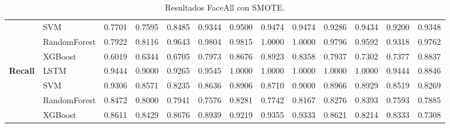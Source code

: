 \begin{table}[h]
\begin{adjustbox}{max width=15cm}
\begin{tabular}{|c|l|r|r|r|r|r|r|r|r|r|r|r|}
			& SVM &  0.7701 &  0.7595 &  0.8485 &  0.9344 &  0.9500 &  0.9474 &  0.9474 &  0.9286 &  0.9434 &  0.9200 &  0.9348 \\
			& RandomForest &  0.7922 &  0.8116 &  0.9643 &  0.9804 &  0.9815 &  1.0000 &  1.0000 &  0.9796 &  0.9592 &  0.9318 &  0.9762 \\
			& XGBoost &  0.6019 &  0.6344 &  0.6705 &  0.7973 &  0.8676 &  0.8923 &  0.8358 &  0.7937 &  0.7302 &  0.7377 &  0.8837 \\
			\hline
			\textbf{Recall} & LSTM &  0.9444 &  0.9000 &  0.9265 &  0.9545 &  1.0000 &  1.0000 &  1.0000 &  1.0000 &  1.0000 &  0.9444 &  0.8846 \\
			& SVM &  0.9306 &  0.8571 &  0.8235 &  0.8636 &  0.8906 &  0.8710 &  0.9000 &  0.8966 &  0.8929 &  0.8519 &  0.8269 \\
			& RandomForest &  0.8472 &  0.8000 &  0.7941 &  0.7576 &  0.8281 &  0.7742 &  0.8167 &  0.8276 &  0.8393 &  0.7593 &  0.7885 \\
			& XGBoost &  0.8611 &  0.8429 &  0.8676 &  0.8939 &  0.9219 &  0.9355 &  0.9333 &  0.8621 &  0.8214 &  0.8333 &  0.7308 \\
			\hline
		\end{tabular}
	\end{adjustbox}
	\label{tab:faceAllSMOTE}
	\caption{Resultados FaceAll con SMOTE.}
\end{table}

